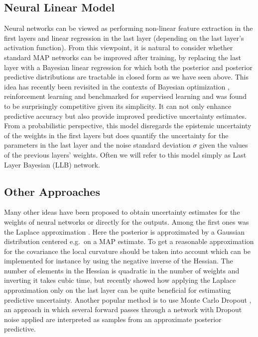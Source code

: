 \documentclass[../thesis.tex]{subfiles}
\begin{document}
\subsection*{Neural Linear Model}
Neural networks can be viewed as performing non-linear feature extraction in the first layers and linear regression in the last layer (depending on the last layer's activation function). From this viewpoint, it is natural to consider whether standard MAP networks can be improved after training, by replacing the last layer with a Bayesian linear regression for which both the posterior and posterior predictive distributions are tractable in closed form as we have seen above. This idea has recently been revisited in the contexts of Bayesian optimization \parencite{snoek2015scalable}, reinforcement learning \parencite{riquelme2018deep} and benchmarked for supervised learning \parencite{ober2019benchmarking} and was found to be surprisingly competitive given its simplicity. It can not only enhance predictive accuracy but also provide improved predictive uncertainty estimates. From a probabilistic perspective, this model disregards the epistemic uncertainty of the weights in the first layers but does quantify the uncertainty for the parameters in the last layer and the noise standard deviation $\sigma$ given the values of the previous layers' weights. Often we will refer to this model simply as Last Layer Bayesian (LLB) network.
    

\subsection*{Other Approaches}
Many other ideas have been proposed to obtain uncertainty estimates for the weights of neural networks or directly for the outputs. Among the first ones was the Laplace approximation \parencite{mackay1992practical}. Here the posterior is approximated by a Gaussian distribution centered e.g.\ on a MAP estimate. To get a reasonable approximation for the covariance the local curvature should be taken into account which can be implemented for instance by using the negative inverse of the Hessian. The number of elements in the Hessian is quadratic in the number of weights and inverting it takes cubic time, but \textcite{kristiadi2020being} recently showed how applying the Laplace approximation only on the last layer can be quite beneficial for estimating predictive uncertainty. Another popular method is to use Monte Carlo Dropout \parencite{gal2016dropout}, an approach in which several forward passes through a network with Dropout noise applied are interpreted as samples from an approximate posterior predictive.
\end{document}

